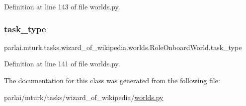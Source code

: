 Definition at line 143 of file worlds.\+py.

\mbox{\label{classparlai_1_1mturk_1_1tasks_1_1wizard__of__wikipedia_1_1worlds_1_1RoleOnboardWorld_a9a12f1f9c3e0648d520b5a60103026e2}} 
\subsubsection{\texorpdfstring{task\+\_\+type}{task\_type}}
{\footnotesize\ttfamily parlai.\+mturk.\+tasks.\+wizard\+\_\+of\+\_\+wikipedia.\+worlds.\+Role\+Onboard\+World.\+task\+\_\+type}



Definition at line 141 of file worlds.\+py.



The documentation for this class was generated from the following file\+:\begin{DoxyCompactItemize}
\item 
parlai/mturk/tasks/wizard\+\_\+of\+\_\+wikipedia/\hyperlink{parlai_2mturk_2tasks_2wizard__of__wikipedia_2worlds_8py}{worlds.\+py}\end{DoxyCompactItemize}
